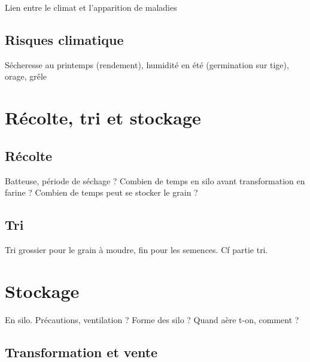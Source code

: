 \documentclass{article}
\begin{document}
Lien entre le climat et l'apparition de maladies

\subsection{Risques climatique}

Sécheresse au printemps (rendement), humidité en été (germination sur tige), orage, grêle

\section{Récolte, tri et stockage}

\subsection{Récolte}

Batteuse, période de séchage ? Combien de temps en silo avant transformation en farine ? Combien de temps peut se stocker le grain ?

\subsection{Tri}

Tri grossier pour le grain à moudre, fin pour les semences. Cf partie tri.

\section{Stockage}

En silo. Précautions, ventilation ? Forme des silo ? Quand aère t-on, comment ? 

\subsection{Transformation et vente}
\end{document}
